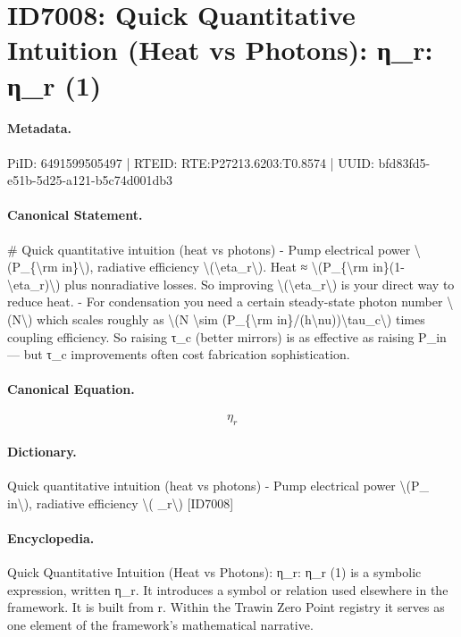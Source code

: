 \section*{ID7008: Quick Quantitative Intuition (Heat vs Photons): η\_r: η\_r (1)}
\paragraph{Metadata.}
PiID: 6491599505497 | RTEID: RTE:P27213.6203:T0.8574 | UUID: bfd83fd5-e51b-5d25-a121-b5c74d001db3

\paragraph{Canonical Statement.}
\# Quick quantitative intuition (heat vs photons) - Pump electrical power \textbackslash{}(P\_\{\textbackslash{}rm in\}\textbackslash{}), radiative efficiency \textbackslash{}(\textbackslash{}eta\_r\textbackslash{}). Heat ≈ \textbackslash{}(P\_\{\textbackslash{}rm in\}(1-\textbackslash{}eta\_r)\textbackslash{}) plus nonradiative losses. So improving \textbackslash{}(\textbackslash{}eta\_r\textbackslash{}) is your direct way to reduce heat. - For condensation you need a certain steady-state photon number \textbackslash{}(N\textbackslash{}) which scales roughly as \textbackslash{}(N \textbackslash{}sim (P\_\{\textbackslash{}rm in\}/(h\textbackslash{}nu))\textbackslash{}tau\_c\textbackslash{}) times coupling efficiency. So raising τ\_c (better mirrors) is as effective as raising P\_in — but τ\_c improvements often cost fabrication sophistication.

\paragraph{Canonical Equation.}
\[
\eta_r
\]

\paragraph{Dictionary.}
Quick quantitative intuition (heat vs photons) - Pump electrical power \textbackslash{}(P\_ in\textbackslash{}), radiative efficiency \textbackslash{}( \_r\textbackslash{}) [ID7008]

\paragraph{Encyclopedia.}
Quick Quantitative Intuition (Heat vs Photons): η\_r: η\_r (1) is a symbolic expression, written η\_r. It introduces a symbol or relation used elsewhere in the framework. It is built from r. Within the Trawin Zero Point registry it serves as one element of the framework's mathematical narrative.
